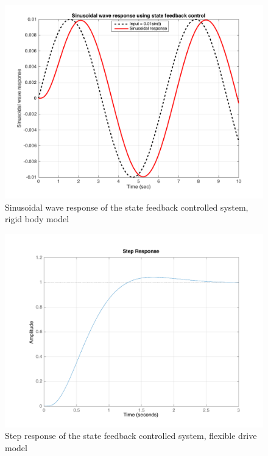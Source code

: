 \documentclass[a4paper, 12pt]{article}
\begin{document}
\begin{figure}[!htbp]
\centering
\includegraphics[scale = 0.3]{SinusoidalResponseStateFeedback}
\caption{Sinusoidal wave response of the state feedback controlled system, rigid body model}
\label{SinusoidalResponseStateFeedback}
\end{figure}


\begin{figure}[!htbp]
\centering
\includegraphics[scale = 0.3]{FlexibleStepResponseStateFeedback}
\caption{Step response of the state feedback controlled system, flexible drive model}
\label{FlexibleStepResponseStateFeedback}
\end{figure}
\end{document}
